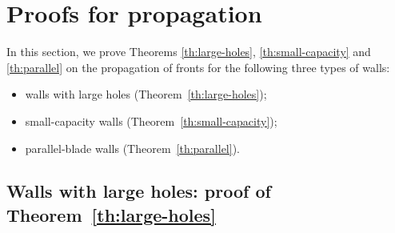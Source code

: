 \documentclass[a4paper,12pt,fullpage]{article}
\numberwithin{equation}{section}
\begin{document}

\section{Proofs for propagation}\label{s:propagation}

In this section, we prove Theorems \ref{th:large-holes}, \ref{th:small-capacity} and \ref{th:parallel} on the propagation of fronts for the following three types of walls:
\begin{itemize}
\item walls with large holes (Theorem~\ref{th:large-holes});
\item small-capacity walls (Theorem~\ref{th:small-capacity});
\item parallel-blade walls (Theorem~\ref{th:parallel}).
\end{itemize}


\subsection{Walls with large holes: proof of Theorem~\ref{th:large-holes}}\label{ss:proof-large-holes}
\end{document}
